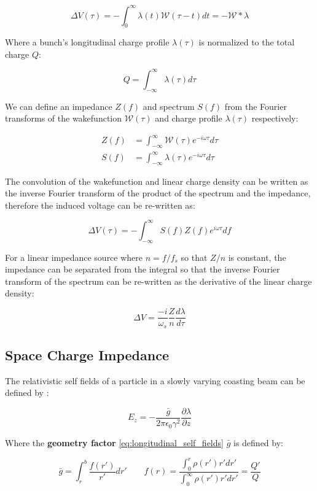 $$\Delta V(\tau)=-\int_0^\infty\lambda(t)\mathcal{W}(\tau-t)dt=-\mathcal{W}*\lambda$$

Where a bunch's longitudinal charge profile $\lambda(\tau)$ is normalized to the total charge $Q$:

$$Q = \int_{-\infty}^\infty \lambda(\tau) d\tau$$

We can define an impedance $Z(f)$ and spectrum $S(f)$ from the Fourier transforms of the wakefunction $\mathcal{W}(\tau)$ and charge profile $\lambda(\tau)$ respectively:

$$\begin{aligned}
    Z(f)&=\int_{-\infty}^\infty\mathcal{W}(\tau)e^{-i\omega\tau}d\tau \\
    S(f)&=\int_{-\infty}^\infty\lambda(\tau)e^{-i\omega\tau}d\tau
\end{aligned}$$

The convolution of the wakefunction and linear charge density can be written as the inverse Fourier transform of the product of the spectrum and the impedance, therefore the induced voltage can be re-written as:

$$\Delta V(\tau)=-\int_{-\infty}^\infty S(f)Z(f)e^{i\omega \tau}df$$

For a linear impedance source where $n = f/f_s$ so that $Z/n$ is constant, the impedance can be separated from the integral so that the inverse Fourier transform of the spectrum can be re-written as the derivative of the linear charge density:

\begin{equation}
    \Delta V=\frac{-i}{\omega_s}\frac{Z}{n}\frac{d\lambda}{d\tau}
    \label{eq:induced_voltage}
\end{equation}

\subsection{Space Charge Impedance}

The relativistic self fields of a particle in a slowly varying coasting beam can be defined by \cite{ferrario_space_2014}:

$$E_z=-\frac{\bar{g}}{2\pi\epsilon_0\gamma^2}\frac{\partial \lambda}{\partial z}$$

Where the \textbf{geometry factor} \ref{eq:longitudinal_self_fields} $\bar{g}$ is defined by:

$$\bar{g}=\int_r^b\frac{f(r')}{r'}dr'\qquad f(r)=\frac{\int_0^r\rho(r')r'dr'}{\int_0^\infty\rho(r')r'dr'}=\frac{Q'}{Q}$$

